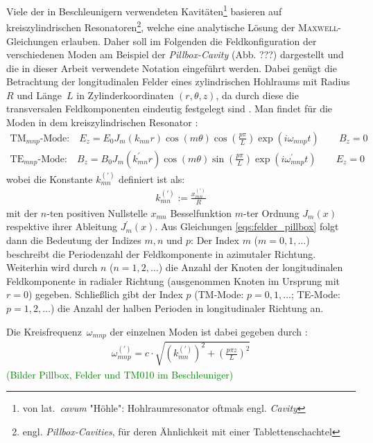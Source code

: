 \documentclass[11pt, a4paper]{scrbook}
\newcommand{\todo}[1]{{\textcolor{Green}{(#1)}}}
\begin{document}
	Viele der in Beschleunigern verwendeten Kavitäten\footnote{von lat.\ \emph{cavum} "Höhle": Hohlraumresonator oftmals engl. \emph{Cavity}} basieren auf kreiszylindrischen Resonatoren\footnote{engl. \emph{Pillbox-Cavities}, für deren Ähnlichkeit mit einer Tablettenschachtel}, welche eine analytische Lösung der \textsc{Maxwell}-Gleichungen erlauben.
	Daher soll im Folgenden die Feldkonfiguration der verschiedenen Moden am Beispiel der \emph{Pillbox-Cavity} (Abb. ???) dargestellt und die in dieser Arbeit verwendete Notation eingeführt werden.
	Dabei genügt die Betrachtung der longitudinalen Felder eines zylindrischen Hohlraums mit Radius~$R$ und Länge~$L$ in Zylinderkoordinaten $(r, \theta, z)$, da durch diese die transversalen Feldkomponenten eindeutig festgelegt sind \cite{hillert}.
	Man findet für die Moden in dem kreiszylindrischen Resonator \cite{wangler}:
	\begin{subequations}
		\begin{align}
		\mathrm{TM}_{mnp}\text{-Mode:} \quad E_z = E_0 J_m(k_{mn} r) \cos(m \theta) \cos\left(\frac{p \pi}{L}\right) \exp(i \omega_{mnp} t) \qquad B_z = 0\\
		\mathrm{TE}_{mnp}\text{-Mode:} \quad B_z = B_0 J_m(k_{mn}^\prime r) \cos(m \theta) \sin\left(\frac{p \pi}{L}\right) \exp(i \omega_{mnp}^\prime t) \qquad  E_z = 0
		\end{align}
		\label{eqs:felder_pillbox}
	\end{subequations}
	wobei die Konstante $k_{mn}^{(\prime)}$ definiert ist als:
	\begin{align}
	k_{mn}^{(\prime)} := \frac{x_{mn}^{(\prime)}}{R}
	\end{align}
	mit der $n$-ten positiven Nullstelle $x_{mn}$ Besselfunktion $m$-ter Ordnung $J_m(x)$ respektive ihrer Ableitung $J_m^\prime(x)$.
	Aus Gleichungen \eqref{eqs:felder_pillbox} folgt dann die Bedeutung der Indizes $m, n$ und $p$:
	Der Index $m$ ($m=0, 1, \dots$) beschreibt die Periodenzahl der Feldkomponente in azimutaler Richtung.
	Weiterhin wird durch $n$ ($n=1, 2, \dots$) die Anzahl der Knoten der longitudinalen Feldkomponente in radialer Richtung (ausgenommen Knoten im Ursprung mit $r=0$) gegeben.
	Schließlich gibt der Index $p$ (TM-Mode: $p= 0, 1, \dots$; TE-Mode: $p = 1, 2, \dots$) die Anzahl der halben Perioden in longitudinaler Richtung an.
	
	Die Kreisfrequenz~$\omega_{mnp}$ der einzelnen Moden ist dabei gegeben durch \cite{wangler}:
	\begin{align}
	\omega_{mnp}^{(\prime)} = c \cdot \sqrt{\left( k_{mn}^{(\prime)}\right)^2 + \left( \frac{p \pi z}{L} \right)^2}
	\end{align}
	\todo{Bilder Pillbox, Felder und TM010 im Beschleuniger}
	
\end{document}

